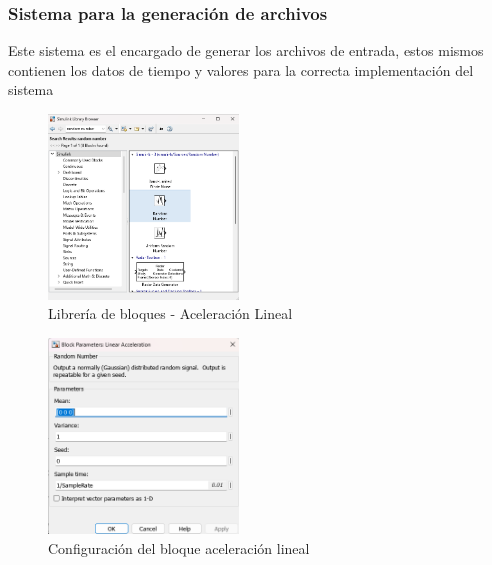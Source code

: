 \subsubsection{Sistema para la generación de archivos}

Este sistema es el encargado de generar los archivos de entrada, estos mismos contienen los datos de tiempo y valores para la correcta implementación del sistema

\begin{figure}[h!]
    \centering
    \includegraphics[width=0.45\textwidth]{fig/Capitulo5/Caso_de_estudio_IMU/Generador_de_archivos/libreria_de_bloques_aceleracion_lineal.png}
    \caption{Librería de bloques - Aceleración Lineal}
    \label{fig:lib_bloques_linear_acceleration}
\end{figure}

\begin{figure}[h!]
    \centering
    \includegraphics[width=0.45\textwidth]{fig/Capitulo5/Caso_de_estudio_IMU/Generador_de_archivos/configuracion_bloque_aceleracion_lineal.png}
    \caption{Configuración del bloque aceleración lineal}
    \label{fig:lib_bloques_config_linear_acceleration}
\end{figure}

